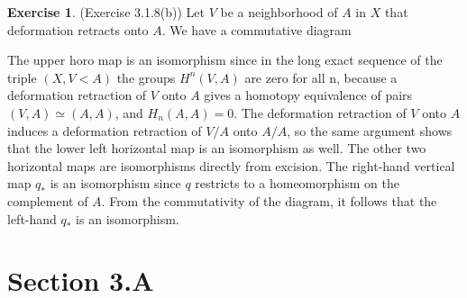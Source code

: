 \documentclass[12pt, psamsfonts]{amsart}
\theoremstyle{definition}
\newtheorem*{exer}{Exercise}
\theoremstyle{remark}
\numberwithin{equation}{section}
\begin{document}
\begin{exer}{(Exercise 3.1.8(b))}
  Let $V$ be a neighborhood of $A$ in $X$ that deformation retracts onto $A$.
  We have a commutative diagram
  \begin{center}
  \end{center}
  The upper horo map is an isomorphism since in the long exact sequence of the triple $(X, V< A)$ the groups $H^n(V, A)$ are zero for all n, because a deformation retraction of $V$ onto $A$ gives a homotopy equivalence of pairs $(V, A) \simeq (A, A)$, and $H_n(A, A) = 0$.
  The deformation retraction of $V$ onto $A$ induces a deformation retraction of $V / A$ onto $A / A$, so the same argument shows that the lower left horizontal map is an isomorphism as well.
  The other two horizontal maps are isomorphisms directly from excision.
  The right-hand vertical map $q_{\ast}$ is an isomorphism since $q$ restricts to a homeomorphism on the complement of $A$.
  From the commutativity of the diagram, it follows that the left-hand $q_{\ast}$ is an isomorphism.
\end{exer}

\section{Section 3.A}
\end{document}

